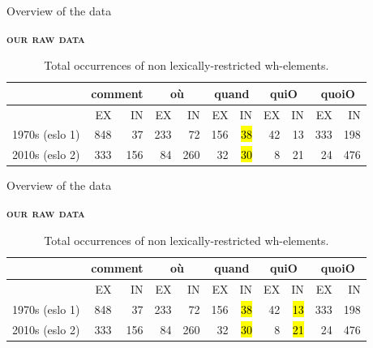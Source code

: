 \documentclass[lesson_slides]{subfiles}
\begin{document}
\begin{frame}[c]{Overview of the data}

\textbf{\textsc{our raw data}}

\begin{table}[H]
    \centering
    \small
    \begin{adjustbox}
        \begin{tabular}{l|rr|rr|rr|rr|rr}
        {} & \multicolumn{2}{c}{comment}  & \multicolumn{2}{c}{où} & \multicolumn{2}{c}{quand} & \multicolumn{2}{c}{quiO}& \multicolumn{2}{c}{quoiO}\\
        \hline
        {} & EX & IN & EX & IN & EX & IN & EX & IN & EX & IN\\
        1970s (eslo 1) & 848 & 37 & 233 & 72 & 156 & \hl{38} & 42 & 13 & 333 & 198\\
        2010s (eslo 2) & 333 & 156 & 84 & 260 & 32 & \hl{30} & 8 & 21 & 24 & 476 \\
        \hline
        \end{tabular}
    \end{adjustbox}
\caption{\label{tab:samp3}Total occurrences of non lexically-restricted wh-elements.}
\end{table}
  
\end{frame}
\begin{frame}[c]{Overview of the data}

\textbf{\textsc{our raw data}}

\begin{table}[H]
    \centering
    \small
    \begin{adjustbox}
        \begin{tabular}{l|rr|rr|rr|rr|rr}
        {} & \multicolumn{2}{c}{comment}  & \multicolumn{2}{c}{où} & \multicolumn{2}{c}{quand} & \multicolumn{2}{c}{quiO}& \multicolumn{2}{c}{quoiO}\\
        \hline
        {} & EX & IN & EX & IN & EX & IN & EX & IN & EX & IN\\
        1970s (eslo 1) & 848 & 37 & 233 & 72 & 156 & \hl{38} & 42 & \hl{13} & 333 & 198\\
        2010s (eslo 2) & 333 & 156 & 84 & 260 & 32 & \hl{30} & 8 & \hl{21} & 24 & 476 \\
        \hline
        \end{tabular}
    \end{adjustbox}
\caption{\label{tab:samp3}Total occurrences of non lexically-restricted wh-elements.}
\end{table}
  
\end{frame}
\end{document}

